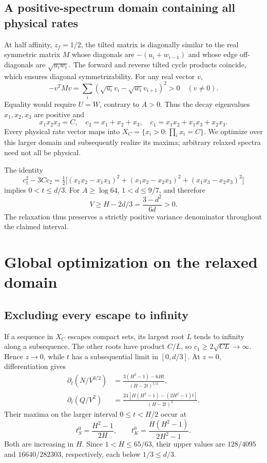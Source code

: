 \documentclass[11pt,a4paper]{article}
\begin{document}
\subsection{A positive-spectrum domain containing all physical rates}
At half affinity, $z_f=1/2$, the tilted matrix is diagonally similar to the real symmetric matrix $M$ whose diagonals are $-(u_i+w_{i-1})$ and whose edge off-diagonals are $\sqrt{u_iw_i}$. The forward and reverse tilted cycle products coincide, which ensures diagonal symmetrizability. For any real vector $v$,
\begin{equation}
 -v^TMv=\sum_i(\sqrt{u_i}v_i-\sqrt{w_i}v_{i+1})^2>0\quad(v\ne0).
\end{equation}
Equality would require $U=W$, contrary to $A>0$. Thus the decay eigenvalues $x_1,x_2,x_3$ are positive and
\begin{equation}\label{eq:spectral}
 x_1x_2x_3=C,\quad c_2=x_1+x_2+x_3,\quad c_1=x_1x_2+x_1x_3+x_2x_3.
\end{equation}
Every physical rate vector maps into $X_C=\{x_i>0:\prod_i x_i=C\}$. We optimize over this larger domain and subsequently realize its maxima; arbitrary relaxed spectra need not all be physical.

The identity
\begin{equation}
 c_1^2-3Cc_2=\tfrac12\big[(x_1x_2-x_1x_3)^2+(x_1x_2-x_2x_3)^2+(x_1x_3-x_2x_3)^2\big]
\end{equation}
implies $0<t\leq d/3$. For $A\geq\log64$, $1<d\leq9/7$, and therefore
\begin{equation}\label{eq:positiveV}
 V\geq H-2d/3=\frac{3-d^2}{6d}>0.
\end{equation}
The relaxation thus preserves a strictly positive variance denominator throughout the claimed interval.

\section{Global optimization on the relaxed domain}
\subsection{Excluding every escape to infinity}
If a sequence in $X_C$ escapes compact sets, its largest root $L$ tends to infinity along a subsequence. The other roots have product $C/L$, so $c_1\geq2\sqrt{CL}\to\infty$. Hence $z\to0$, while $t$ has a subsequential limit in $[0,d/3]$. At $z=0$, differentiation gives
\begin{align}
 \partial_t(N/V^{3/2})&=\frac{3(H^2-1)-6Ht}{(H-2t)^{5/2}},\\
 \partial_t(Q/V^2)&=\frac{24[H(H^2-1)-(2H^2-1)t]}{(H-2t)^3}.
\end{align}
Their maxima on the larger interval $0\leq t<H/2$ occur at
\begin{equation}
 t_S^0=\frac{H^2-1}{2H},\qquad t_K^0=\frac{H(H^2-1)}{2H^2-1}.
\end{equation}
Both are increasing in $H$. Since $1<H\leq65/63$, their upper values are $128/4095$ and $16640/282303$, respectively, each below $1/3\leq d/3$.
\end{document}

